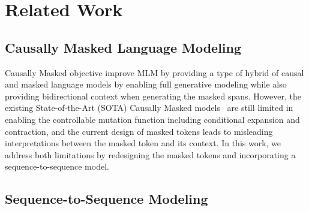 \section{Related Work}
\label{sec:related}










\subsection{Causally Masked Language Modeling}

Causally Masked objective improve MLM by providing a type of hybrid of causal and masked language models by enabling full generative modeling while also providing bidirectional context when generating the masked spans. 
However, the existing State-of-the-Art (SOTA) Causally Masked models~\citep{aghajanyan2022cm3} are still limited in enabling the controllable mutation function including conditional expansion and contraction, and the current design of masked tokens leads to misleading interpretations between the masked token and its context. In this work, we address both limitations by redesigning the masked tokens and incorporating a sequence-to-sequence model.

\subsection{Sequence-to-Sequence Modeling }

